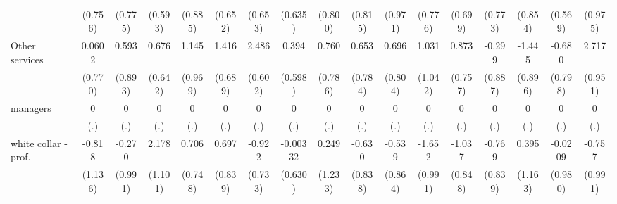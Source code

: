 {\begin{tabular}{l*{16}{c}}
                    &     (0.756)         &     (0.775)         &     (0.593)         &     (0.885)         &     (0.652)         &     (0.653)         &     (0.635)         &     (0.800)         &     (0.815)         &     (0.971)         &     (0.776)         &     (0.699)         &     (0.773)         &     (0.854)         &     (0.569)         &     (0.975)         \\
[1em]
Other services      &      0.0602         &       0.593         &       0.676         &       1.145         &       1.416\sym{*}  &       2.486\sym{***}&       0.394         &       0.760         &       0.653         &       0.696         &       1.031         &       0.873         &      -0.299         &      -1.445         &      -0.680         &       2.717\sym{**} \\
                    &     (0.770)         &     (0.893)         &     (0.642)         &     (0.969)         &     (0.689)         &     (0.602)         &     (0.598)         &     (0.786)         &     (0.784)         &     (0.804)         &     (1.042)         &     (0.757)         &     (0.887)         &     (0.896)         &     (0.798)         &     (0.951)         \\
[1em]
managers            &           0         &           0         &           0         &           0         &           0         &           0         &           0         &           0         &           0         &           0         &           0         &           0         &           0         &           0         &           0         &           0         \\
                    &         (.)         &         (.)         &         (.)         &         (.)         &         (.)         &         (.)         &         (.)         &         (.)         &         (.)         &         (.)         &         (.)         &         (.)         &         (.)         &         (.)         &         (.)         &         (.)         \\
[1em]
white collar - prof.&      -0.818         &      -0.270         &       2.178\sym{*}  &       0.706         &       0.697         &      -0.922         &    -0.00332         &       0.249         &      -0.630         &      -0.539         &      -1.652         &      -1.037         &      -0.769         &       0.395         &     -0.0209         &      -0.757         \\
                    &     (1.136)         &     (0.991)         &     (1.101)         &     (0.748)         &     (0.839)         &     (0.733)         &     (0.630)         &     (1.233)         &     (0.838)         &     (0.864)         &     (0.991)         &     (0.848)         &     (0.839)         &     (1.163)         &     (0.980)         &     (0.991)         \\

\end{tabular}}
